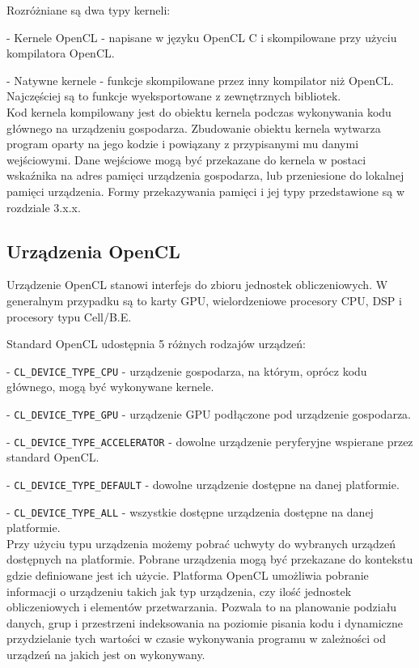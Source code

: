 Rozróżniane są dwa typy kerneli:

- Kernele OpenCL - napisane w języku OpenCL C i skompilowane przy użyciu kompilatora OpenCL.

- Natywne kernele - funkcje skompilowane przez inny kompilator niż OpenCL. Najczęściej są to funkcje wyeksportowane z zewnętrznych bibliotek.\\

Kod kernela kompilowany jest do obiektu kernela podczas wykonywania kodu głównego na urządzeniu gospodarza. Zbudowanie obiektu kernela wytwarza program oparty na jego kodzie i powiązany z przypisanymi mu danymi wejściowymi. Dane wejściowe mogą być przekazane do kernela w postaci wskaźnika na adres pamięci urządzenia gospodarza, lub przeniesione do lokalnej pamięci urządzenia. Formy przekazywania pamięci i jej typy przedstawione są w rozdziale 3.x.x.

\subsection{Urządzenia OpenCL}\label{sec:OpenC21L}

Urządzenie OpenCL stanowi interfejs do zbioru jednostek obliczeniowych. W generalnym przypadku są to karty GPU, wielordzeniowe procesory CPU, DSP i procesory typu Cell/B.E.

Standard OpenCL udostępnia 5 różnych rodzajów urządzeń:

- \verb|CL_DEVICE_TYPE_CPU| - urządzenie gospodarza, na którym, oprócz kodu głównego, mogą być wykonywane kernele.

- \verb|CL_DEVICE_TYPE_GPU| - urządzenie GPU podłączone pod urządzenie gospodarza.

- \verb|CL_DEVICE_TYPE_ACCELERATOR| - dowolne urządzenie peryferyjne wspierane przez standard OpenCL.

- \verb|CL_DEVICE_TYPE_DEFAULT| - dowolne urządzenie dostępne na danej platformie.

- \verb|CL_DEVICE_TYPE_ALL| - wszystkie dostępne urządzenia dostępne na danej platformie.\\

Przy użyciu typu urządzenia możemy pobrać uchwyty do wybranych urządzeń dostępnych na platformie. Pobrane urządzenia mogą być przekazane do kontekstu gdzie definiowane jest ich użycie. Platforma OpenCL umożliwia pobranie informacji o urządzeniu takich jak typ urządzenia, czy ilość jednostek obliczeniowych i elementów przetwarzania. Pozwala to na planowanie podziału danych, grup i przestrzeni indeksowania na poziomie pisania kodu i dynamiczne przydzielanie tych wartości w czasie wykonywania programu w zależności od urządzeń na jakich jest on wykonywany.
 
